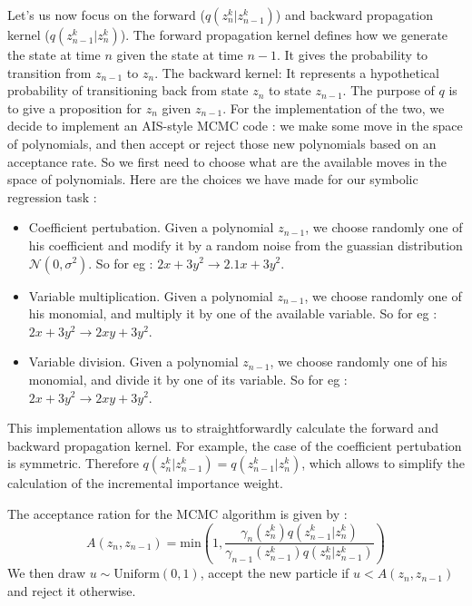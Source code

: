 \documentclass[11pt]{article}
\newcommand{\ce}[1]{\marginpar{\parbox{\marginparwidth}{\boldmath $\Longleftarrow$}}{\boldmath\bfseries (ce: #1)}}
\begin{document}
\begin{itemize}[label=\textbullet]
		Let's us now focus on the forward ($q(z_n^k | z_{n-1}^k)$) and backward propagation kernel ($q(z_{n-1}^k | z_n^k)$). The forward propagation kernel defines how we generate the state at time $n$ given the state at time $n-1$. It gives the probability to transition from $z_{n-1}$ to $z_n$. The backward kernel: It represents a hypothetical probability of transitioning back from state $z_n$ to state $z_{n-1}$. The purpose of $q$ is to give a proposition for $z_n$ given $z_{n-1}$. For the implementation of the two, we decide to implement an AIS-style MCMC code : we make some move in the space of polynomials, and then accept or reject those new polynomials based on an acceptance rate. So we first need to choose what are the available moves in the space of polynomials. Here are the choices we have made for our symbolic regression task : 
		\begin{itemize}
			\item Coefficient pertubation. Given a polynomial $z_{n-1}$, we choose randomly one of his coefficient and modify it by a random noise from the guassian distribution $\mathcal{N}(0,\sigma^2)$. So for eg : $2 x + 3 y^2 \rightarrow  2.1 x + 3 y^2$.
			\item Variable multiplication. Given a polynomial $z_{n-1}$, we choose randomly one of his monomial, and multiply it by one of the available variable. So for eg : $2 x + 3 y^2 \rightarrow  2 x y + 3 y^2$.
			\item Variable division. Given a polynomial $z_{n-1}$, we choose randomly one of his monomial, and divide it by one of its variable. So for eg : $2 x + 3 y^2 \rightarrow  2 x y + 3 y^2$. \ce{Change the example.}
		\end{itemize}
		This implementation allows us to straightforwardly calculate the forward and backward propagation kernel.  For example, the case of the coefficient pertubation is symmetric. Therefore $q(z_n^k | z_{n-1}^k) = q(z_{n-1}^k | z_n^k)$, which allows to simplify the calculation of the incremental importance weight. 
		
		The acceptance ration for the MCMC algorithm is given by : 
		\begin{equation}
			A(z_n,z_{n-1}) = \mathrm{min} \left(1,\frac{ \gamma_n(z_n^k) q(z_{n-1}^k | z_n^k) }{ \gamma_{n-1}(z_{n-1}^k) q(z_n^k | z_{n-1}^k) }  \right)
		\end{equation}
		We then draw $u\sim \mathrm{Uniform}(0,1)$, accept the new particle if $u<A(z_n,z_{n-1})$ and reject it otherwise.
		

\end{itemize}
\end{document}
